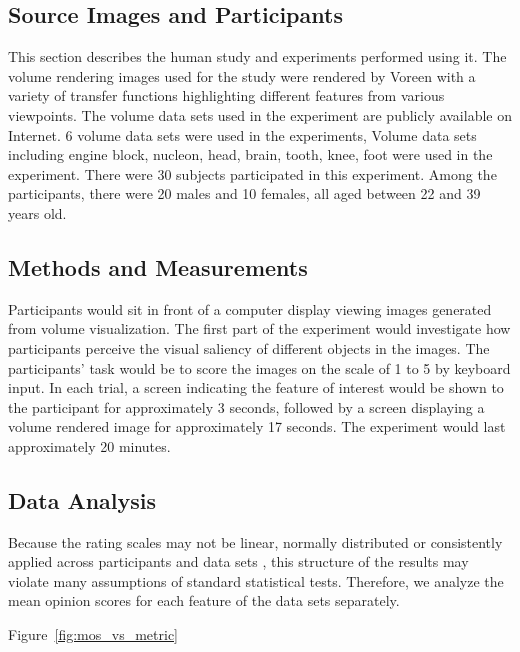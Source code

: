 \subsection{Source Images and Participants}
This section describes the human study and experiments performed using it.
The volume rendering images used for the study were rendered by Voreen \cite{meyer-spradow_voreen:_2009} with a variety of transfer functions highlighting different features from various viewpoints. The volume data sets used in the experiment are publicly available on Internet.
6 volume data sets were used in the experiments, 
Volume data sets including engine block, nucleon, head, brain, tooth, knee, foot \cite{website:Roettger_volume_2013} \cite{website:Voreen_datasets_2013} were used in the experiment.
There were 30 subjects participated in this experiment. Among the participants, there were 20 males and 10 females, all aged between 22 and 39 years old.

\subsection{Methods and Measurements}
Participants would sit in front of a computer display viewing images generated from volume visualization. The first part of the experiment would investigate how participants perceive the visual saliency of different objects in the images. The participants’ task would be to score the images on the scale of 1 to 5 by keyboard input. 
In each trial, a screen indicating the feature of interest would be shown to the participant for approximately 3 seconds, followed by a screen displaying a volume rendered image for approximately 17 seconds.
The experiment would last approximately 20 minutes.

\subsection{Data Analysis}
Because the rating scales may not be linear, normally distributed or consistently applied across participants and data sets \cite{cunningham_experimental_2011}, this structure of the results may violate many assumptions of standard statistical tests. Therefore, we analyze the mean opinion scores for each feature of the data sets separately.

Figure~\ref{fig:mos_vs_metric}

